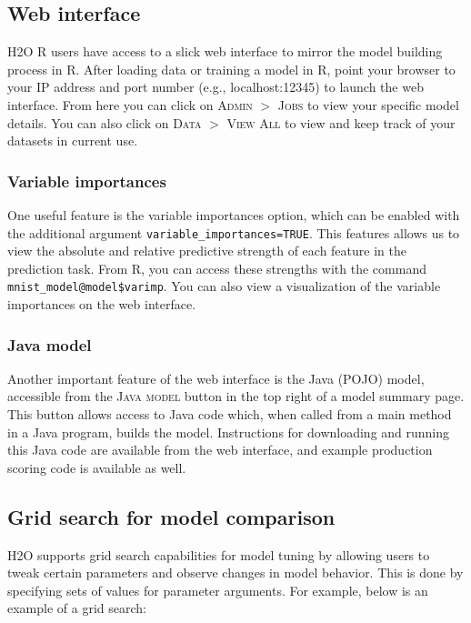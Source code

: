 \documentclass[11pt]{article}
\begin{document}
\subsection{Web interface} \label{3.3}

H2O R users have access to a slick web interface to mirror the model building process in R. After loading data or training a model in R, point your browser to your IP address and port number (e.g., localhost:12345) to launch the web interface. From here you can click on \textsc{Admin} $>$ \textsc{Jobs} to view your specific model details. You can also click on \textsc{Data} $>$ \textsc{View All} to view and keep track of your datasets in current use. 

\subsubsection{Variable importances} \label{3.3.1}

One useful feature is the variable importances option, which can be enabled with the additional argument \texttt{variable\_importances=TRUE}. This features allows us to view the absolute and relative predictive strength of each feature in the prediction task. From R, you can access these strengths with the command \texttt{mnist\_model@model\$varimp}. You can also view a visualization of the variable
importances on the web interface.

\subsubsection{Java model} \label{3.3.2}

Another important feature of the web interface is the Java (POJO) model, accessible from the \textsc{Java model} button in the top right of a model summary page. This button allows access to Java code which, when called from a main method in a Java program, builds the model. Instructions for downloading and running this Java code are available from the web interface, and example production scoring code is available as well.

\subsection{Grid search for model comparison} \label{3.4}

H2O supports grid search capabilities for model tuning by allowing users to tweak certain parameters and observe changes in model behavior. This is done by specifying sets of values for parameter arguments. For example, below is an example of a grid search:
\end{document}
